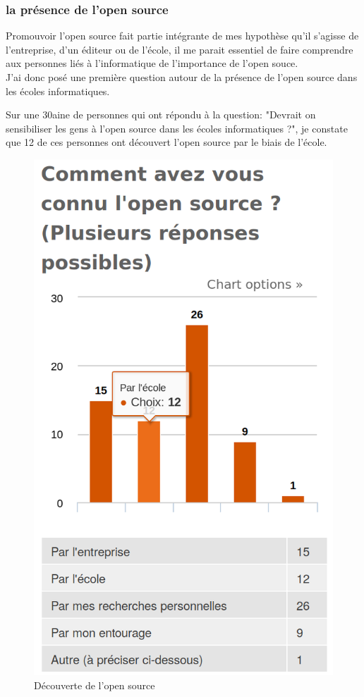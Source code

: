 			\subsubsection{la présence de l'open source}

				Promouvoir l'open source fait partie intégrante de mes hypothèse qu'il s'agisse de l'entreprise, d'un éditeur ou de l'école, il me parait essentiel de faire comprendre aux personnes liés à l'informatique de l'importance de l'open souce. \\
				J'ai donc posé une première question autour de la présence de l'open source dans les écoles informatiques.

				Sur une 30aine de personnes qui ont répondu à la question: "Devrait on sensibiliser les gens à l'open source dans les écoles informatiques ?", je constate que 12 de ces personnes ont découvert l'open source par le biais de l'école.

				\begin{figure}[!htb]
					\center
					\includegraphics[scale=0.28]{./img/a3}
					\caption{Découverte de l'open source}
				\end{figure}


